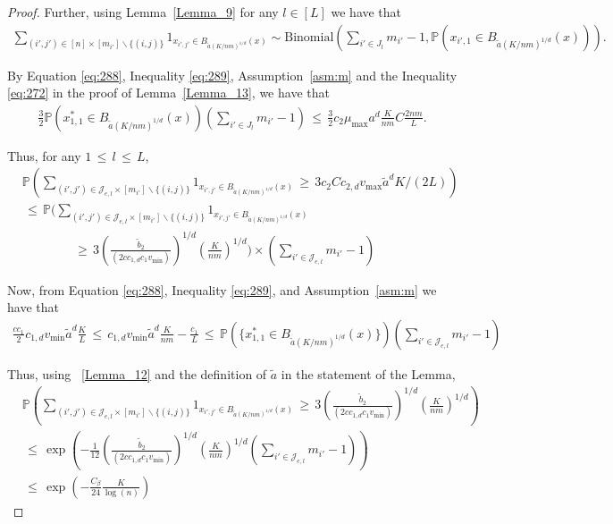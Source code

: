 \documentclass[twoside,11pt]{article}
\begin{document}
\begin{proof}
Further, using Lemma~\ref{Lemma_9} for any \( l \in [L] \) we have that
\begin{align}
\sum_{(i',j')\in[n] \times [m_{i'}]\backslash\{(i,j)\}} 1_{x_{i',j'}\in B_{\tilde a(K/nm)^{1/d}}(x)} \sim \text{Binomial}\left( \sum_{i' \in J_l} m_{i'} - 1, \mathbb{P}(x_{i',1} \in B_{\tilde a(K/nm)^{1/d}}(x)) \right).
\end{align}

By Equation \eqref{eq:288}, Inequality \eqref{eq:289}, Assumption~\ref{asm:m} and the Inequality \eqref{eq:272} in the proof of Lemma~\ref{Lemma_13}, we have that
\begin{align}
\frac{3}{2} \mathbb{P}\left(x_{1,1}^* \in B_{\tilde a(K/nm)^{1/d}}(x)\right) \left( \sum_{i' \in J_l} m_{i'} - 1 \right) \,\leq\, \frac{3}{2} c_2\mu_{\text{max}}a^d \frac{K}{nm} C \frac{2nm}{L}.
\end{align}

Thus, for any \( 1 \,\leq\, l \,\leq\, L \),
\begin{align}
    &\mathbb{P}\left( \sum_{(i',j')\in\mathcal{J}_{e,l}\times[m_{i'}]\backslash\{(i,j)\}} 1_{x_{i',j'} \in B_{\tilde a(K/nm)^{1/d}}(x)} \,\geq\, 3c_2Cc_{2,d}v_{\text{max}}{\tilde a}^dK/(2L) \right) \nonumber
   \\ &\,\leq\, \mathbb{P}\bigg( \sum_{(i',j')\in\mathcal{J}_{e,l}\times[m_{i'}]\backslash\{(i,j)\}} 1_{x_{i',j'} \in B_{\tilde a(K/nm)^{1/d}}(x)} \nonumber \\
   &\qquad\qquad \,\geq\, 3 \left(\frac{\tilde{b}_2}{(2cc_{1,d}c_1v_{\text{min}})}\right)^{1/d} \left( \frac{K}{nm} \right)^{1/d} \bigg)  \times \left( \sum_{i' \in \mathcal{J}_{e,l}} m_{i'} - 1 \right) \label{eq:303}
\end{align}

Now, from Equation \eqref{eq:288}, Inequality \eqref{eq:289}, and Assumption~\ref{asm:m} we have that
\begin{align}
    \frac{cc_1}{2} c_{1,d}v_{\text{min}}{\tilde a}^d\frac{K}{L} \,\leq\, c_{1,d}v_{\text{min}}{\tilde a}^d\frac{K}{nm} - \frac{c_1}{L} \,\leq\, \mathbb{P}\left( \{x_{1,1}^* \in B_{\tilde a(K/nm)^{1/d}}(x)\} \right) \left( \sum_{i' \in \mathcal{J}_{e,l}} m_{i'} - 1 \right) \label{eq:304}
\end{align}

Thus, using ~\ref{Lemma_12} and the definition of \(\tilde{a}\) in the statement of the Lemma,
\begin{align}
    &\mathbb{P}\left( \sum_{(i',j')\in\mathcal{J}_{e,l}\times[m_{i'}]\backslash\{(i,j)\}} 1_{x_{i',j'} \in B_{\tilde a(K/nm)^{1/d}}(x)} \,\geq\, 3 \left(\frac{\tilde{b}_2}{(2cc_{1,d}c_1v_{\text{min}})}\right)^{1/d} \left( \frac{K}{nm} \right)^{1/d} \right) \nonumber
    \\ &\,\leq\, \exp\left( -\frac{1}{12} \left(\frac{\tilde{b}_2}{(2cc_{1,d}c_1v_{\text{min}})}\right)^{1/d} \left( \frac{K}{nm} \right)^{1/d} \left( \sum_{i' \in \mathcal{J}_{e,l}} m_{i'} - 1 \right) \right) \nonumber 
    \\ &\,\leq\, \exp\left( -\frac{C_{\beta}}{24} \frac{K}{\log(n)} \right) \label{eq:305}
\end{align}


\end{proof}
\end{document}
